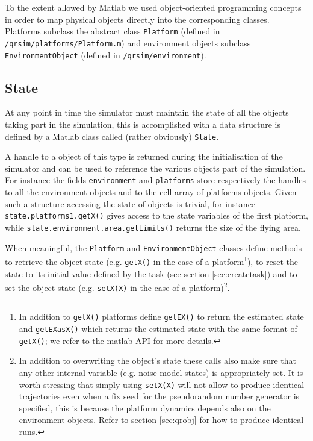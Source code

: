 \documentclass[a4paper,11pt]{report}
\begin{document}
To the extent allowed by Matlab we used object-oriented programming concepts in order to map physical objects directly into the corresponding classes. Platforms subclass the abstract class \texttt{Platform} (defined in \texttt{/qrsim/platforms/Platform.m}) and environment objects subclass \texttt{EnvironmentObject} (defined in \texttt{/qrsim/environment}).

\subsection{State}\label{sec:state}

At any point in time the simulator must maintain the state of all the objects taking part in the simulation, this is accomplished with a data structure is defined by a Matlab class called (rather obviously) \texttt{State}.
 
A handle to a object of this type is returned during the initialisation of the simulator and can be used to reference the various objects part of the simulation. For instance the fields \texttt{environment} and \texttt{platforms} store respectively the handles to all the environment objects and to the cell array of platforms objects. 
Given such a structure accessing the state of objects is trivial, for instance \texttt{state.platforms{1}.getX()} gives access to the state variables of the first platform, while \texttt{state.environment.area.getLimits()} returns the size of the flying area. 

When meaningful, the \texttt{Platform} and \texttt{EnvironmentObject} classes define methods to retrieve the object state (e.g. \texttt{getX()} in the case of a platform\footnote{In addition to \texttt{getX()} platforms define \texttt{getEX()} to return the estimated state and \texttt{getEXasX()} which returns the estimated state with the same format of \texttt{getX()}; we refer to the matlab API for more details.}), to reset the state to its initial value defined by the task (see section \ref{sec:createtask}) and to set the object state (e.g. \texttt{setX(X)} in the case of a platform)\footnote{In addition to overwriting the object's state these calls also make sure that any other internal variable (e.g. noise model states) is appropriately set. It is worth stressing that simply using \texttt{setX(X)} will not allow to produce identical trajectories even when a fix seed for the pseudorandom number generator is specified, this is because the platform dynamics depends also on the environment objects. Refer to section  
\ref{sec:qrobj} for how to produce identical runs.}.
\end{document}
